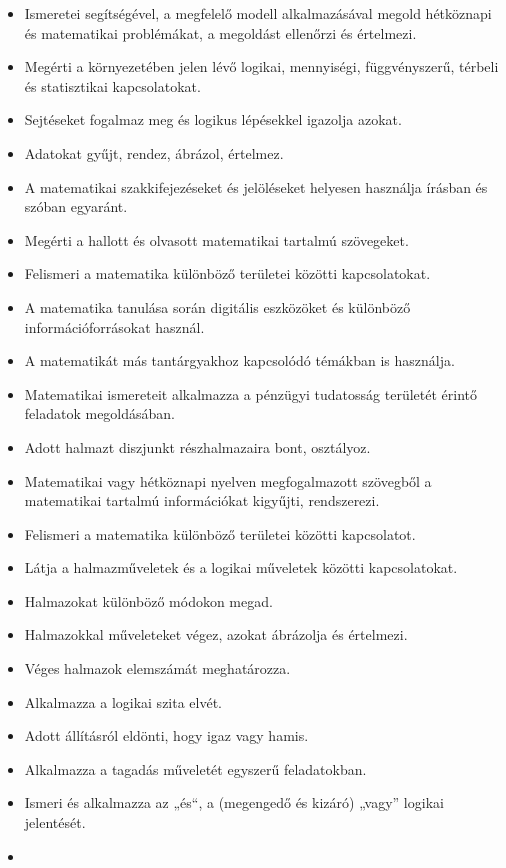 \begin{itemize}
\item
  Ismeretei segítségével, a megfelelő modell alkalmazásával megold
  hétköznapi és matematikai problémákat, a megoldást ellenőrzi és
  értelmezi.
\item
  Megérti a környezetében jelen lévő logikai, mennyiségi, függvényszerű,
  térbeli és statisztikai kapcsolatokat.
\item
  Sejtéseket fogalmaz meg és logikus lépésekkel igazolja azokat.
\item
  Adatokat gyűjt, rendez, ábrázol, értelmez.
\item
  A matematikai szakkifejezéseket és jelöléseket helyesen használja
  írásban és szóban egyaránt.
\item
  Megérti a hallott és olvasott matematikai tartalmú szövegeket.
\item
  Felismeri a matematika különböző területei közötti kapcsolatokat.
\item
  A matematika tanulása során digitális eszközöket és különböző
  információforrásokat használ.
\item
  A matematikát más tantárgyakhoz kapcsolódó témákban is használja.
\item
  Matematikai ismereteit alkalmazza a pénzügyi tudatosság területét
  érintő feladatok megoldásában.
\item
  Adott halmazt diszjunkt részhalmazaira bont, osztályoz.
\item
  Matematikai vagy hétköznapi nyelven megfogalmazott szövegből a
  matematikai tartalmú információkat kigyűjti, rendszerezi.
\item
  Felismeri a matematika különböző területei közötti kapcsolatot.
\item
  Látja a halmazműveletek és a logikai műveletek közötti kapcsolatokat.
\item
  Halmazokat különböző módokon megad.
\item
  Halmazokkal műveleteket végez, azokat ábrázolja és értelmezi.
\item
  Véges halmazok elemszámát meghatározza.
\item
  Alkalmazza a logikai szita elvét.
\item
  Adott állításról eldönti, hogy igaz vagy hamis.
\item
  Alkalmazza a tagadás műveletét egyszerű feladatokban.
\item
  Ismeri és alkalmazza az „és``, a (megengedő és kizáró) „vagy'' logikai
  jelentését.
\item

\end{itemize}
